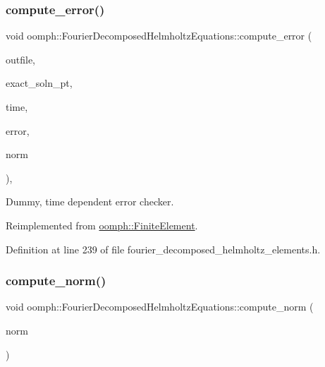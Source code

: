 \subsubsection{\texorpdfstring{compute\+\_\+error()}{compute\_error()}\hspace{0.1cm}{\footnotesize\ttfamily [2/2]}}
{\footnotesize\ttfamily void oomph\+::\+Fourier\+Decomposed\+Helmholtz\+Equations\+::compute\+\_\+error (\begin{DoxyParamCaption}\item[{std\+::ostream \&}]{outfile,  }\item[{\hyperlink{classoomph_1_1FiniteElement_ad4ecf2b61b158a4b4d351a60d23c633e}{Finite\+Element\+::\+Unsteady\+Exact\+Solution\+Fct\+Pt}}]{exact\+\_\+soln\+\_\+pt,  }\item[{const double \&}]{time,  }\item[{double \&}]{error,  }\item[{double \&}]{norm }\end{DoxyParamCaption})\hspace{0.3cm}{\ttfamily [inline]}, {\ttfamily [virtual]}}



Dummy, time dependent error checker. 



Reimplemented from \hyperlink{classoomph_1_1FiniteElement_a7f67853506dc73fa6b7505108de22d1f}{oomph\+::\+Finite\+Element}.



Definition at line 239 of file fourier\+\_\+decomposed\+\_\+helmholtz\+\_\+elements.\+h.

\mbox{\label{classoomph_1_1FourierDecomposedHelmholtzEquations_a8139e48ff406de0f7b2c76d007b9e7e3}} 
\subsubsection{\texorpdfstring{compute\+\_\+norm()}{compute\_norm()}}
{\footnotesize\ttfamily void oomph\+::\+Fourier\+Decomposed\+Helmholtz\+Equations\+::compute\+\_\+norm (\begin{DoxyParamCaption}\item[{double \&}]{norm }\end{DoxyParamCaption})\hspace{0.3cm}{\ttfamily [virtual]}}



